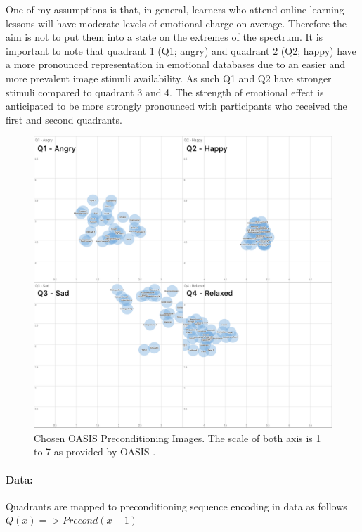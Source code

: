 One of my assumptions is that, in general, learners who attend online learning lessons will have moderate levels of emotional charge on average. Therefore the aim is not to put them into a state on the extremes of the spectrum. It is important to note that quadrant 1 (Q1; angry) and quadrant 2 (Q2; happy) have a more pronounced representation in emotional databases due to an easier and more prevalent image stimuli availability. As such Q1 and Q2 have stronger stimuli compared to quadrant 3 and 4. The strength of emotional effect is anticipated to be more strongly pronounced with participants who received the first and second quadrants.







\begin{figure}[h!]
	\centering
	\includegraphics[width=1\linewidth]{graphics/All_Preconditionings}
	\caption{Chosen OASIS Preconditioning Images. The scale of both axis is 1 to 7 as provided by OASIS \cite{Kurdi2017}.}
	\label{fig:allpreconditionings}
\end{figure}


\paragraph{Data:} Quadrants are mapped to preconditioning sequence encoding in data as follows \(Q(x) => Precond(x-1)\)